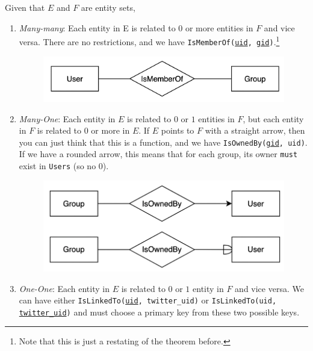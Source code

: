     \begin{definition}
      Given that $E$ and $F$ are entity sets, 
      \begin{enumerate}
        \item \textit{Many-many}: Each entity in E is related to $0$ or more entities in $F$ and vice versa. There are no restrictions, and we have \texttt{IsMemberOf(\underline{uid}, \underline{gid})}.\footnote{Note that this is just a restating of the theorem before.} 

        \begin{figure}[H]
          \centering 
          \includegraphics[scale=0.3]{img/ismember.png}
          \caption{} 
          \label{fig:ismember}
        \end{figure}

        \item \textit{Many-One}: Each entity in $E$ is related to $0$ or $1$ entities in $F$, but each entity in $F$ is related to $0$ or more in $E$. If $E$ points to $F$ with a straight arrow, then you can just think that this is a function, and we have \texttt{IsOwnedBy(\underline{gid}, uid)}. If we have a rounded arrow, this means that for each group, its owner \texttt{must} exist in \texttt{Users} (so no $0$). 

        \begin{figure}[H]
          \centering 
          \includegraphics[scale=0.3]{img/isowned.png}
          \caption{} 
          \label{fig:isowned}
        \end{figure}

      \item \textit{One-One}: Each entity in $E$ is related to $0$ or $1$ entity in $F$ and vice versa. We can have either \texttt{IsLinkedTo(\underline{uid}, twitter\_uid)} or \texttt{IsLinkedTo(uid, \underline{twitter\_uid})} and must choose a primary key from these two possible keys.  


\end{enumerate}
\end{definition}
